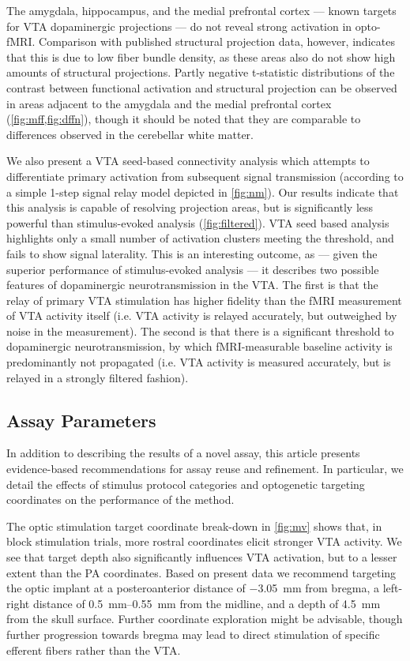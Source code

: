 The amygdala, hippocampus, and the medial prefrontal cortex --- known targets for VTA dopaminergic projections --- do not reveal strong activation in opto-fMRI.
Comparison with published structural projection data, however, indicates that this is due to low fiber bundle density, as these areas also do not show high amounts of structural projections.
Partly negative t-statistic distributions of the contrast between functional activation and structural projection can be observed in areas adjacent to the amygdala and the medial prefrontal cortex (\cref{fig:mff,fig:dffn}), though it should be noted that they are comparable to differences observed in the cerebellar white matter.

We also present a VTA seed-based connectivity analysis which attempts to differentiate primary activation from subsequent signal transmission (according to a simple 1-step signal relay model depicted in \cref{fig:nm}).
Our results indicate that this analysis is capable of resolving projection areas, but is significantly less powerful than stimulus-evoked analysis (\cref{fig:filtered}).
VTA seed based analysis highlights only a small number of activation clusters meeting the threshold, and fails to show signal laterality.
This is an interesting outcome, as --- given the superior performance of stimulus-evoked analysis --- it describes two possible features of dopaminergic neurotransmission in the VTA.
The first is that the relay of primary VTA stimulation has higher fidelity than the fMRI measurement of VTA activity itself (i.e. VTA activity is relayed accurately, but outweighed by noise in the measurement).
The second is that there is a significant threshold to dopaminergic neurotransmission, by which fMRI-measurable baseline activity is predominantly not propagated (i.e. VTA activity is measured accurately, but is relayed in a strongly filtered fashion).

\subsection{Assay Parameters}

In addition to describing the results of a novel assay, this article presents evidence-based recommendations for assay reuse and refinement.
In particular, we detail the effects of stimulus protocol categories and optogenetic targeting coordinates on the performance of the method.

The optic stimulation target coordinate break-down in \cref{fig:mv} shows that, in block stimulation trials, more rostral coordinates elicit stronger VTA activity.
We see that target depth also significantly influences VTA activation, but to a lesser extent than the PA coordinates.
Based on present data we recommend targeting the optic implant at
a posteroanterior distance of \SI{-3.05}{\milli\meter} from bregma,
a left-right distance of \SIrange{0.5}{0.55}{\milli\meter} from the midline,
and a depth of \SI{4.5}{\milli\meter} from the skull surface.
Further coordinate exploration might be advisable, though further progression towards bregma may lead to direct stimulation of specific efferent fibers rather than the VTA.

